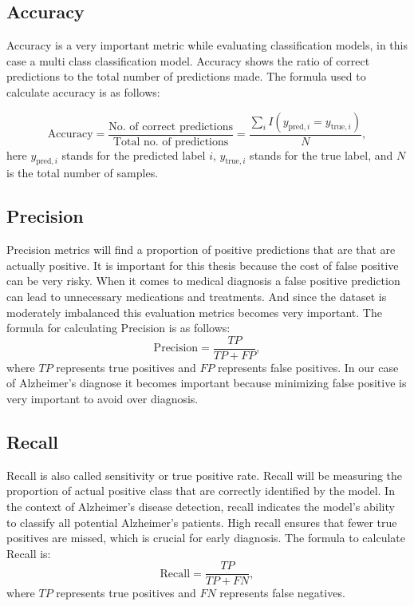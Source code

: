 \documentclass[12pt,onecolumn]{report}
\begin{document}
\subsection{Accuracy}
Accuracy is a very important metric while evaluating classification models, in this case a multi class classification model. Accuracy shows the ratio of correct predictions to the total number of predictions made. The formula used to calculate accuracy is as follows:

\begin{equation}
    \text{Accuracy} = \frac{\text{No. of correct predictions}}{\text{Total no. of predictions}} = \frac{\sum_{i} I(y_{\text{pred},i} = y_{\text{true},i})}{N},
\end{equation}
here \( y_{\text{pred},i} \) stands for the predicted label \( i \), \( y_{\text{true},i} \) stands for the true label, and \( N \) is the total number of samples.

\subsection{Precision}
Precision metrics will find a proportion of positive predictions that are that are actually positive. It is important for this thesis because the cost of false positive can be very risky. When it comes to medical diagnosis a false positive prediction can lead to unnecessary medications and treatments. And since the dataset is moderately imbalanced this evaluation metrics becomes very important. The formula for calculating Precision is as follows:
\begin{equation}
    \text{Precision} = \frac{TP}{TP + FP},
\end{equation}
where \( TP \) represents true positives and \( FP \) represents false positives.
In our case of Alzheimer’s diagnose it becomes important because minimizing false positive is very important to avoid over diagnosis.

\subsection{Recall}
Recall is also called sensitivity or true positive rate. Recall will be measuring the proportion of actual positive class that are correctly identified by the model. In the context of Alzheimer's disease detection, recall indicates the model’s ability to classify all potential Alzheimer’s patients. High recall ensures that fewer true positives are missed, which is crucial for early diagnosis. The formula to calculate Recall is:
\begin{equation}
    \text{Recall} = \frac{TP}{TP + FN},
\end{equation}
where \( TP \) represents true positives and \( FN \) represents false negatives.
\end{document}
